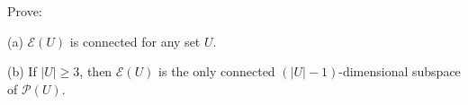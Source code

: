 Prove:

(a) $\mathcal{E}(U)$ is connected for any set $U$.

(b) If $|U| \geq 3$, then $\mathcal{E}(U)$ is the only connected $(|U| - 1)$-dimensional subspace of $\mathcal{P}(U)$.
